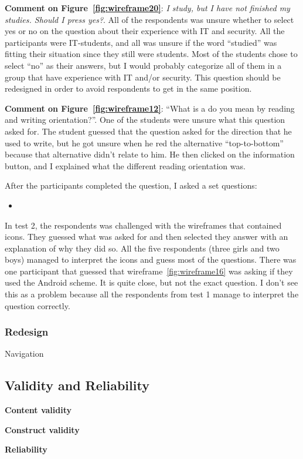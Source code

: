   {\bf Comment on Figure~\ref{fig:wireframe20}}: {\it I study, but I have not finished my studies. Should I press yes?}. All of the respondents was unsure whether to select yes or no on the question about their experience with IT and security. All the participants were IT-students, and all was unsure if the word ``studied'' was fitting their situation since they still were students. Most of the students chose to select ``no'' as their answers, but I would probably categorize all of them in a group that have experience with IT and/or security. This question should be redesigned in order to avoid respondents to get in the same position. 

  {\bf Comment on Figure~\ref{fig:wireframe12}}: ``What is a do you mean by reading and writing orientation?''. One of the students were unsure what this question asked for. The student guessed that the question asked for the direction that he used to write, but he got unsure when he red the alternative ``top-to-bottom'' because that alternative didn't relate to him. He then clicked on the information button, and I explained what the different reading orientation was.



  After the participants completed the question, I asked a set questions:

  \begin{itemize}
    \item 
  \end{itemize}

  In test 2, the respondents was challenged with the wireframes that contained icons. They guessed what was asked for and then selected they answer with an explanation of why they did so. All the five respondents (three girls and two boys) managed to interpret the icons and guess most of the questions. 
  There was one participant that guessed that wireframe~\ref{fig:wireframe16} was asking if they used the Android scheme. It is quite close, but not the exact question. I don't see this as a problem because all the respondents from test 1 manage to interpret the question correctly.

  \subsubsection*{Redesign}

  Navigation

  \subsection{Validity and Reliability}\label{sec:validityandreliability}

    {\bf Content validity}

    {\bf Construct validity}

    {\bf Reliability}